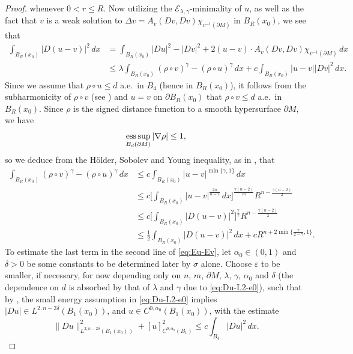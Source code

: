 \documentclass[11pt]{amsart}
\newcommand{\cE}{{\mathcal E}}
\newcommand{\e}{\varepsilon}
\newcommand{\esssup}{\operatornamewithlimits{ess\,sup}}
\theoremstyle{plain}
\theoremstyle{definition}
\theoremstyle{remark}
\numberwithin{equation}{section}
\begin{document}
\begin{proof}
whenever $0<r\leq R$. Now utilizing the $\cE_{\lambda,\gamma}$-minimality of $u$, as well as the fact that $v$ is a weak solution to $\Delta v = A_v(Dv,Dv)\chi_{v^{-1}(\partial M)}$ in $B_{R}(x_0)$, we see that
\begin{equation}
    \label{eq:Eu-Ev}
    \begin{aligned}
    \int_{B_{R}(x_0)} |D(u-v)|^2\,dx & = \int_{B_{R}(x_0)} |Du|^2 - |Dv|^2 + 2(u- v)\cdot A_v(Dv,Dv)\chi_{v^{-1}(\partial M)}\,dx\\
    &\leq {\lambda} \int_{B_{R}(x_0)} (\rho\circ v)^\gamma - (\rho\circ u)^\gamma\,dx + c \int_{B_{R}(x_0)} |u-v| |Dv|^2\,dx.
    \end{aligned}
\end{equation}
Since we assume that $\rho\circ u \leq d$ a.e.\ in $B_4$ (hence in $B_R(x_0)$), it follows from the subharmonicity of $\rho\circ v$ (see \cite[Lemma 3.2]{FGKS2}) and $u = v$ on $\partial B_R(x_0)$ that $\rho\circ v \leq d$ a.e.\ in $B_R(x_0)$. Since $\rho$ is the signed distance function to a smooth hypersurface $\partial M$, we have 
$$
\esssup_{B_d(\partial M)}|\nabla\rho| \leq 1, 
$$
so we deduce from the H\"older, Sobolev and Young inequality, as in \cite[Page 246]{GG2}, that
\begin{equation}
    \label{eq:I}
    \begin{aligned}
    \int_{B_{R}(x_0)} (\rho\circ v)^\gamma - (\rho\circ u)^\gamma\,dx &\leq c \int_{B_{R}(x_0)} |u-v|^{\min\{\gamma,1\}}\,dx \\
    &\leq c \bigg[\int_{B_{R}(x_0)} |u-v|^{\frac{2n}{n-2}}\,dx \bigg]^{\frac{\gamma(n-2)}{2n}} {R}^{n-\frac{\gamma(n-2)}{2}} \\
    &\leq c \bigg[\int_{B_{R}(x_0)} |D(u-v)|^2 \bigg]^{\frac{\gamma}{2}} {R}^{n-\frac{\gamma(n-2)}{2}} \\
    &\leq \frac{1}{2}\int_{B_{R}(x_0)} |D(u-v)|^2\,dx + c {R}^{n + 2\min\{\frac{\gamma}{2-\gamma},1\}}.
    \end{aligned}
\end{equation}
To estimate the last term in the second line of \eqref{eq:Eu-Ev}, let $\alpha_0\in(0,1)$ and $\delta > 0$ be some constants to be determined later by $\sigma$ alone. Choose ${\e}$ to be smaller, if necessary, for now depending only  on $n$, $m$, $\partial M$, $\lambda$, $\gamma$, $\alpha_0$ and $\delta$ (the dependence on $d$ is absorbed by that of $\lambda$ and $\gamma$ due to \eqref{eq:Du-L2-e0}), such that by \cite[Proposition 1]{L}, the small energy assumption in \eqref{eq:Du-L2-e0} implies $|Du|\in L^{2,n-2\delta}(B_1(x_0))$, and $u\in C^{0,\alpha_0}(B_1(x_0))$, with the estimate 
\begin{equation}
    \label{eq:u-Ca}
\| Du\|_{L^{2,n-2\delta}(B_1(x_0))}^2 + [u]_{C^{0,\alpha_0}(B_1)}^2 \leq c\int_{B_4} |Du|^2\,dx.
\end{equation}


\end{proof}
\end{document}
